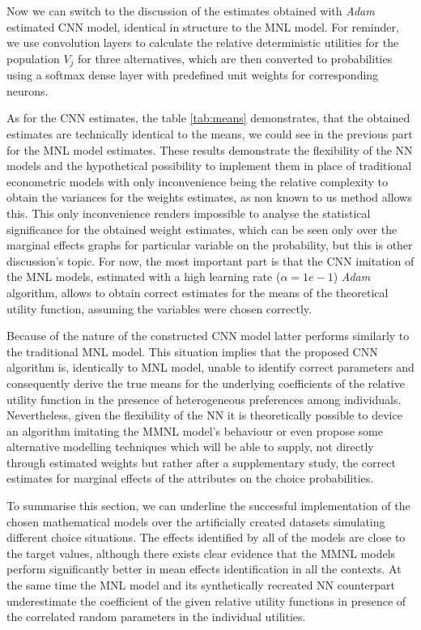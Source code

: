 \documentclass[12pt,]{article}
\begin{document}
Now we can switch to the discussion of the estimates obtained with
\emph{Adam} estimated CNN model, identical in structure to the MNL
model. For reminder, we use convolution layers to calculate the relative
deterministic utilities for the population \(V_j\) for three
alternatives, which are then converted to probabilities using a softmax
dense layer with predefined unit weights for corresponding neurons.

As for the CNN estimates, the table \ref{tab:means} demonstrates, that
the obtained estimates are technically identical to the means, we could
see in the previous part for the MNL model estimates. These results
demonstrate the flexibility of the NN models and the hypothetical
possibility to implement them in place of traditional econometric models
with only inconvenience being the relative complexity to obtain the
variances for the weights estimates, as non known to us method allows
this. This only inconvenience renders impossible to analyse the
statistical significance for the obtained weight estimates, which can be
seen only over the marginal effects graphs for particular variable on
the probability, but this is other discussion's topic. For now, the most
important part is that the CNN imitation of the MNL models, estimated
with a high learning rate (\(\alpha = 1e-1\)) \emph{Adam} algorithm,
allows to obtain correct estimates for the means of the theoretical
utility function, assuming the variables were chosen correctly.

Because of the nature of the constructed CNN model latter performs
similarly to the traditional MNL model. This situation implies that the
proposed CNN algorithm is, identically to MNL model, unable to identify
correct parameters and consequently derive the true means for the
underlying coefficients of the relative utility function in the presence
of heterogeneous preferences among individuals. Nevertheless, given the
flexibility of the NN it is theoretically possible to device an
algorithm imitating the MMNL model's behaviour or even propose some
alternative modelling techniques which will be able to supply, not
directly through estimated weights but rather after a supplementary
study, the correct estimates for marginal effects of the attributes on
the choice probabilities.

To summarise this section, we can underline the successful
implementation of the chosen mathematical models over the artificially
created datasets simulating different choice situations. The effects
identified by all of the models are close to the target values, although
there exists clear evidence that the MMNL models perform significantly
better in mean effects identification in all the contexts. At the same
time the MNL model and its synthetically recreated NN counterpart
underestimate the coefficient of the given relative utility functions in
presence of the correlated random parameters in the individual
utilities.
\end{document}
